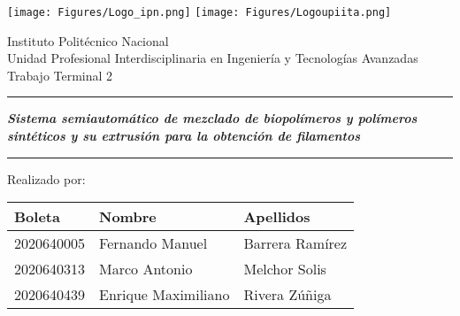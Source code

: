 \documentclass[14pt,oneside]{extarticle} %
\begin{document}
\fancyhf{}
\renewcommand{\headrulewidth}{0pt}

\begin{adjustwidth}{0cm}{0cm}
\begin{center}
    \texttt{[image: Figures/Logo\_ipn.png]} \hfill
    \texttt{[image: Figures/Logoupiita.png]}

    \vspace{0.5cm} %

    {\LARGE %
    {Instituto Politécnico Nacional}  \\
    \vspace{0.2cm}
    Unidad Profesional Interdisciplinaria en Ingeniería y Tecnologías Avanzadas \\
    \vspace{1.5cm}
    Trabajo Terminal 2
    }

    \vspace{0.5cm} %

    \rule{\textwidth}{1pt}

    {\LARGE %
    \textit{\textbf{Sistema semiautomático de mezclado de biopolímeros y polímeros sintéticos y su extrusión para la obtención de filamentos}}
    }

    \rule{\textwidth}{1pt}

    \vspace{0.5cm} %

    {\LARGE %
    Realizado por:
    }

    \vspace{0.5cm} %

    {\large %
    \begin{center}
        \begin{tabular}{| l | l | l |}
            \hline
            \rowcolor{Custom_color_1}
            \textbf{Boleta} & \textbf{Nombre} & \textbf{Apellidos} \\
            \hline
            2020640005 & Fernando Manuel & Barrera Ramírez \\ 
            \hline
            2020640313 & Marco Antonio & Melchor Solis \\ 
            \hline
            2020640439 & Enrique Maximiliano & Rivera Zúñiga \\ 
            \hline
        \end{tabular}
    \end{center}
    }
\end{center}
\end{adjustwidth}
\end{document}
